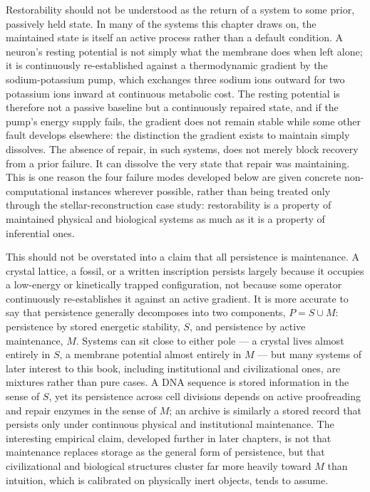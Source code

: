 \documentclass[12pt]{report}
\begin{document}
Restorability should not be understood as the return of a system to some
prior, passively held state. In many of the systems this chapter draws on,
the maintained state is itself an active process rather than a default
condition. A neuron's resting potential is not simply what the membrane
does when left alone; it is continuously re-established against a
thermodynamic gradient by the sodium-potassium pump, which exchanges three
sodium ions outward for two potassium ions inward at continuous metabolic
cost. The resting potential is therefore not a passive baseline but a
continuously repaired state, and if the pump's energy supply fails, the
gradient does not remain stable while some other fault develops elsewhere:
the distinction the gradient exists to maintain simply dissolves. The
absence of repair, in such systems, does not merely block recovery from a
prior failure. It can dissolve the very state that repair was maintaining.
This is one reason the four failure modes developed below are given
concrete non-computational instances wherever possible, rather than being
treated only through the stellar-reconstruction case study: restorability
is a property of maintained physical and biological systems as much as it
is a property of inferential ones.

This should not be overstated into a claim that all persistence is
maintenance. A crystal lattice, a fossil, or a written inscription
persists largely because it occupies a low-energy or kinetically trapped
configuration, not because some operator continuously re-establishes it
against an active gradient. It is more accurate to say that persistence
generally decomposes into two components, $P = S \cup M$: persistence by
stored energetic stability, $S$, and persistence by active maintenance,
$M$. Systems can sit close to either pole --- a crystal lives almost
entirely in $S$, a membrane potential almost entirely in $M$ --- but many
systems of later interest to this book, including institutional and
civilizational ones, are mixtures rather than pure cases. A DNA sequence
is stored information in the sense of $S$, yet its persistence across
cell divisions depends on active proofreading and repair enzymes in the
sense of $M$; an archive is similarly a stored record that persists only
under continuous physical and institutional maintenance. The interesting
empirical claim, developed further in later chapters, is not that
maintenance replaces storage as the general form of persistence, but that
civilizational and biological structures cluster far more heavily toward
$M$ than intuition, which is calibrated on physically inert objects,
tends to assume.
\end{document}
